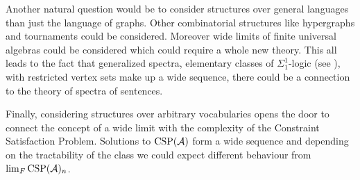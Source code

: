 Another natural question would be to consider structures over general languages than just the language of graphs. Other combinatorial structures like hypergraphs and tournaments could be considered. Moreover wide limits of finite universal algebras could be considered which could require a whole new theory. This all leads to the fact that generalized spectra, elementary classes of $\Sigma_1^1$-logic (see \cite{Fagin74}), with restricted vertex sets make up a wide sequence, there could be a connection to the theory of spectra of sentences.

Finally, considering structures over arbitrary vocabularies opens the door to connect the concept of a wide limit with the complexity of the Constraint Satisfaction Problem. Solutions to $\text{CSP}(\mathcal{A})$ form a wide sequence and depending on the tractability of the class we could expect different behaviour from $\lim_{F}\text{CSP}(\mathcal{A})_n$.
